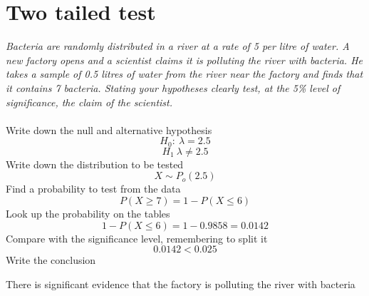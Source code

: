 \documentclass{article}[18pt]
\begin{document}
\section{Two tailed test}
\textit{Bacteria are randomly distributed in a river at a rate of 5 per litre of water. A new factory opens
and a scientist claims it is polluting the river with bacteria. He takes a sample of 0.5 litres of
water from the river near the factory and finds that it contains 7 bacteria. Stating your
hypotheses clearly test, at the 5\% level of significance, the claim of the scientist.}\\
\\
Write down the null and alternative hypothesis
$$H_0: \ \lambda=2.5$$
$$H_1 \ \lambda\neq2.5$$
Write down the distribution to be tested
$$X\sim P_o(2.5)$$
Find a probability to test from the data
$$P(X\geqslant7)=1-P(X\leqslant6)$$
Look up the probability on the tables
$$1-P(X\leqslant6)=1-0.9858=0.0142$$
Compare with the significance level, remembering to split it
$$0.0142<0.025$$
Write the conclusion
\begin{center}
There is significant evidence that the factory is polluting the river with bacteria
\end{center}
\end{document}
